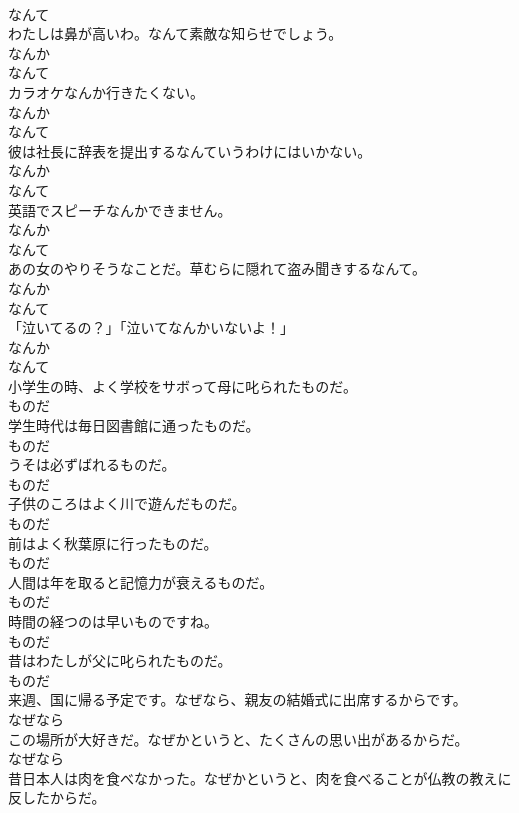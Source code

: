\documentclass[8pt]{extreport}
\begin{document}
\begin{CJK}{UTF8}{min}
\\	なんて	
\\	わたしは鼻が高いわ。なんて素敵な知らせでしょう。	
\\	なんか 
\\	なんて	
\\	カラオケなんか行きたくない。	
\\	なんか 
\\	なんて	
\\	彼は社長に辞表を提出するなんていうわけにはいかない。	
\\	なんか 
\\	なんて	
\\	英語でスピーチなんかできません。	
\\	なんか 
\\	なんて	
\\	あの女のやりそうなことだ。草むらに隠れて盗み聞きするなんて。	
\\	なんか 
\\	なんて	
\\	「泣いてるの？」「泣いてなんかいないよ！」	
\\	なんか 
\\	なんて	
\\	小学生の時、よく学校をサボって母に叱られたものだ。	
\\	ものだ	
\\	学生時代は毎日図書館に通ったものだ。	
\\	ものだ	
\\	うそは必ずばれるものだ。	
\\	ものだ	
\\	子供のころはよく川で遊んだものだ。	
\\	ものだ	
\\	前はよく秋葉原に行ったものだ。	
\\	ものだ	
\\	人間は年を取ると記憶力が衰えるものだ。	
\\	ものだ	
\\	時間の経つのは早いものですね。	
\\	ものだ	
\\	昔はわたしが父に叱られたものだ。	
\\	ものだ	
\\	来週、国に帰る予定です。なぜなら、親友の結婚式に出席するからです。	
\\	なぜなら	
\\	この場所が大好きだ。なぜかというと、たくさんの思い出があるからだ。	
\\	なぜなら	
\\	昔日本人は肉を食べなかった。なぜかというと、肉を食べることが仏教の教えに反したからだ。	

\end{CJK}
\end{document}
